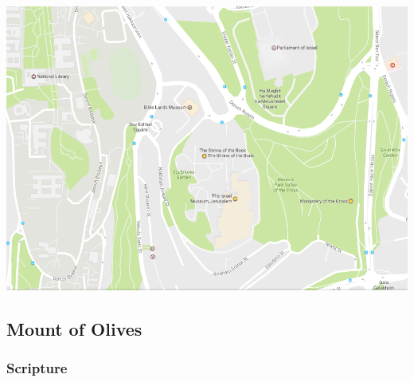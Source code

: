 \documentclass[letterpaper]{report}
\begin{document}
\includegraphics[width=\textwidth]{IsraelMuseum}

\clearpage
\subsection{Mount of Olives}
\begin{multicols}{2}
	\mbox{}
\end{multicols}
\subsubsection{Scripture}
\end{document}

